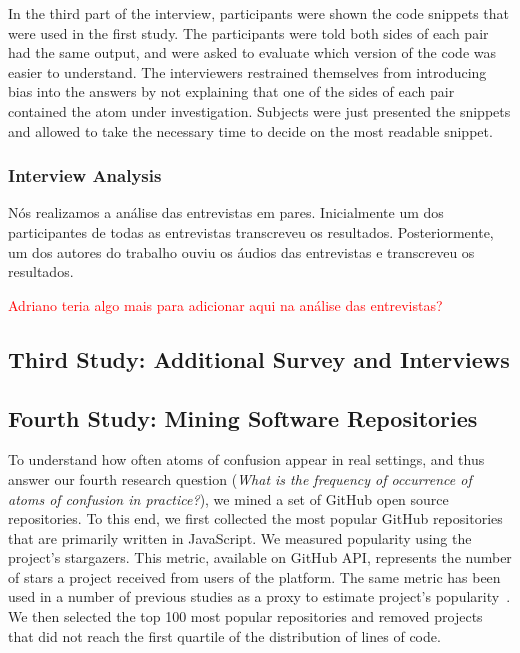 In the third part of the interview, participants were shown the code snippets that were used in the first study. The participants were told both sides of each pair had the same output, and were asked to evaluate which version of the code was easier to understand. The interviewers restrained themselves from introducing bias into the answers by not explaining that one of the sides of each pair contained the atom under investigation. Subjects were just presented the snippets and allowed to take the necessary time to decide on the most readable snippet.

\subsubsection{Interview Analysis}

{\color{red}Nós realizamos a análise das entrevistas em pares. Inicialmente um dos participantes de todas as entrevistas transcreveu os resultados. Posteriormente, um dos autores do trabalho ouviu os áudios das entrevistas e transcreveu os resultados.} 

\textcolor{red}{Adriano teria algo mais para adicionar aqui na  análise das entrevistas?}


\subsection{Third Study: Additional Survey and Interviews}



\subsection{Fourth Study: Mining Software Repositories}

To understand how often atoms of confusion appear in real settings, and thus answer our fourth research question (\emph{What is the frequency of occurrence of atoms of confusion in practice?}), we mined a set of GitHub open source repositories. To this end, we first collected the most popular GitHub repositories that are primarily written in JavaScript. We measured popularity using the project's stargazers. This metric, available on  GitHub API, represents the number of stars a project received from users of the platform. The same metric has been used in a number of previous studies as a proxy to estimate project's popularity~\cite{gyimesi2019bugsjs,canedo:esem2020}. We then selected the top 100 most popular repositories and removed projects that did not reach the first quartile of the distribution of lines of code.

